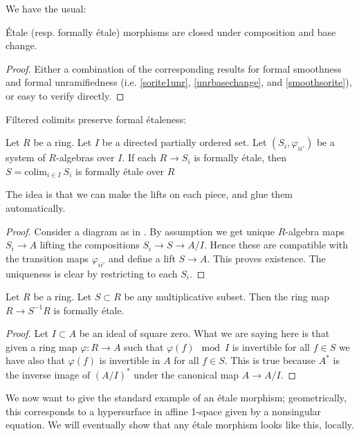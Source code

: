 We have the usual:
\begin{proposition} 
\'Etale (resp. formally \'etale) morphisms are closed under composition
and base change.
\end{proposition} 
\begin{proof} 
Either a combination of the corresponding results for formal
smoothness and formal unramifiedness (i.e.  \cref{sorite1unr}, 
\cref{unrbasechange}, and  \cref{smoothsorite}), or easy to verify
directly.
\end{proof} 

Filtered colimits preserve formal \'etaleness:
\begin{lemma}
\label{lemma-colimit-formally-etale}
Let $R$ be a ring. Let $I$ be a directed partially ordered set.
Let $(S_i, \varphi_{ii'})$ be a system of $R$-algebras
over $I$. If each $R \to S_i$ is formally \'etale, then
$S = \text{colim}_{i \in I}\ S_i$ is formally \'etale over $R$
\end{lemma}
The idea is that we can make the lifts on each piece, and glue them
automatically.
\begin{proof}
Consider a diagram as in .
By assumption we get unique $R$-algebra maps $S_i \to A$ lifting
the compositions $S_i \to S \to A/I$. Hence these are compatible
with the transition maps $\varphi_{ii'}$ and define a lift
$S \to A$. This proves existence.
The uniqueness is clear by restricting to each $S_i$.
\end{proof}

\begin{lemma}
\label{lemma-localization-formally-etale}
Let $R$ be a ring. Let $S \subset R$ be any multiplicative subset.
Then the ring map $R \to S^{-1}R$ is formally \'etale.
\end{lemma}

\begin{proof}
Let $I \subset A$ be an ideal of square zero. What we are saying
here is that given a ring map $\varphi : R \to A$ such that
$\varphi(f) \mod I$ is invertible for all $f \in S$ we have also that
$\varphi(f)$ is invertible in $A$ for all $f \in S$. This is true because
$A^*$ is the inverse image of $(A/I)^*$ under the canonical map
$A \to A/I$.
\end{proof}


We now want to give the standard example of an \'etale morphism;
geometrically, this corresponds to a hypersurface in affine 1-space given by
a nonsingular equation. We will eventually show that any \'etale
morphism looks like this, locally. 


